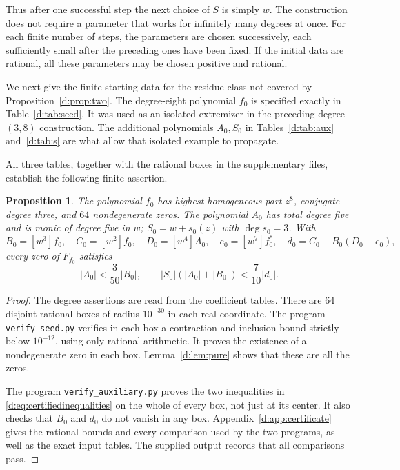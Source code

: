 \documentclass[UTF8,11pt]{ctexart}
\newtheorem{prop}[thm]{Proposition}
\theoremstyle{definition}
\numberwithin{equation}{section}
\begin{document}
Thus after one successful step the next choice of $S$ is simply $w$.
The construction does not require a parameter that works for infinitely
many degrees at once. For each finite number of steps, the parameters
are chosen successively, each sufficiently small after the preceding
ones have been fixed. If the initial data are rational, all these
parameters may be chosen positive and rational.

We next give the finite starting data for the residue class not covered
by Proposition~\ref{d:prop:two}. The degree-eight polynomial $f_0$ is
specified exactly in Table~\ref{d:tab:seed}. It was used as an isolated
extremizer in the preceding degree-$(3,8)$ construction. The additional
polynomials $A_0,S_0$ in Tables~\ref{d:tab:aux} and~\ref{d:tab:s} are what
allow that isolated example to propagate.

All three tables, together with the rational boxes in the supplementary
files, establish the following finite assertion.
\begin{prop}\label{d:prop:certificate}
The polynomial $f_0$ has highest homogeneous part $z^8$, conjugate degree
three, and $64$ nondegenerate zeros. The polynomial $A_0$ has total degree
five and is monic of degree five in $w$; $S_0=w+s_0(z)$ with
$\deg s_0=3$. With
\[
 B_0=[w^3]f_0,\quad C_0=[w^2]f_0,\quad D_0=[w^4]A_0,\quad
 e_0=[w^7]f_0^*,\quad d_0=C_0+B_0(D_0-e_0),
\]
every zero of $F_{f_0}$ satisfies
\begin{equation}\label{d:eq:certifiedinequalities}
 |A_0|<\frac3{50}|B_0|,\qquad
 |S_0|(|A_0|+|B_0|)<\frac7{10}|d_0|.
\end{equation}
\end{prop}
\begin{proof}
The degree assertions are read from the coefficient tables. There are
$64$ disjoint rational boxes of radius $10^{-30}$ in each real coordinate.
The program \texttt{verify\_seed.py} verifies in each box a contraction
and inclusion bound strictly below $10^{-12}$, using only rational
arithmetic. It proves the existence of a nondegenerate zero in each box.
Lemma~\ref{d:lem:pure} shows that these are all the zeros.

The program \texttt{verify\_auxiliary.py} proves the two inequalities
in \eqref{d:eq:certifiedinequalities} on the whole of every box, not just
at its center. It also checks that $B_0$ and $d_0$ do not vanish in any
box. Appendix~\ref{d:app:certificate} gives the rational bounds and every
comparison used by the two programs, as well as the exact input tables.
The supplied output records that all comparisons pass.
\end{proof}
\end{document}
